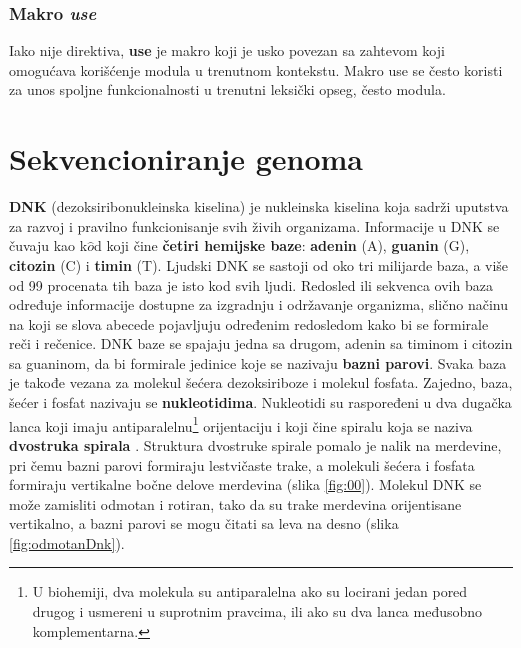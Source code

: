 \documentclass[12pt,oneside]{memoir}
\begin{document}
\subsection{Makro \textit{use}}
Iako nije direktiva, \textbf{use} je makro koji je usko povezan sa zahtevom koji omogućava korišćenje modula u trenutnom kontekstu. Makro use se često koristi za unos spoljne funkcionalnosti u trenutni leksički opseg, često modula.


\chapter{Sekvencioniranje genoma}
\label{poglavlje:Bio}

\begin{comment}
Posle prve rečenice da li ubaciti?
Sva živa bića svoj genetički materijal nose u obliku DNK, sa izuzetkom nekih virusa koji imaju ribonukleinsku kiselinu (RNK).\end{comment}

\textbf{DNK} (dezoksiribonukleinska kiselina) je nukleinska kiselina koja sadrži uputstva za razvoj i pravilno funkcionisanje svih živih organizama. Informacije u DNK se čuvaju kao k$\hat{o}$d koji čine \textbf{četiri hemijske baze}: \textbf{adenin} (A), \textbf{guanin} (G), \textbf{citozin} (C) i \textbf{timin} (T). Ljudski DNK se sastoji od oko tri milijarde baza, a više od 99 procenata tih baza je isto kod svih ljudi. Redosled ili sekvenca ovih baza određuje informacije dostupne za izgradnju i održavanje organizma, slično načinu na koji se slova abecede pojavljuju određenim redosledom kako bi se formirale reči i rečenice. DNK baze se spajaju jedna sa drugom, adenin sa timinom i citozin sa guaninom, da bi formirale jedinice koje se nazivaju \textbf{bazni parovi}. Svaka baza je takođe vezana za molekul šećera dezoksiriboze i molekul fosfata. Zajedno, baza, šećer i fosfat nazivaju se \textbf{nukleotidima}. Nukleotidi su raspoređeni u dva dugačka lanca koji imaju antiparalelnu\footnote{U biohemiji, dva molekula su antiparalelna ako su locirani jedan pored drugog i usmereni u suprotnim pravcima, ili ako su dva lanca međusobno komplementarna.} orijentaciju i koji čine spiralu koja se naziva \textbf{dvostruka spirala} \cite{DNA}. Struktura dvostruke spirale pomalo je nalik na merdevine, pri čemu bazni parovi formiraju lestvičaste trake, a molekuli šećera i fosfata formiraju vertikalne bočne delove merdevina (slika \ref{fig:00}). Molekul DNK se može zamisliti odmotan i rotiran, tako da su trake merdevina orijentisane vertikalno, a bazni parovi se mogu čitati sa leva na desno (slika \ref{fig:odmotanDnk}).
\end{document}
